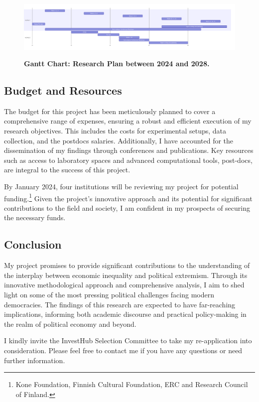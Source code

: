 \documentclass[letterpaper]{article}
\begin{document}
\begin{figure}[h]
\caption{{\bf Gantt Chart: Research Plan between 2024 and 2028.}}
\includegraphics[width=\textwidth]{gantt.png} 
\label{fig:1}
\end{figure}


\subsection*{Budget and Resources}

The budget for this project has been meticulously planned to cover a comprehensive range of expenses, ensuring a robust and efficient execution of my research objectives. This includes the costs for experimental setups, data collection, and the postdocs salaries. Additionally, I have accounted for the dissemination of my findings through conferences and publications. Key resources such as access to laboratory spaces and advanced computational tools, post-docs, are integral to the success of this project. 

\vspace{2mm}By January 2024, four institutions will be reviewing my project for potential funding.\footnote{Kone Foundation, Finnish Cultural Foundation, ERC and Research Council of Finland.} Given the project's innovative approach and its potential for significant contributions to the field and society, I am confident in my prospects of securing the necessary funds. 

\subsection*{Conclusion}

My project promises to provide significant contributions to the understanding of the interplay between economic inequality and political extremism. Through its innovative methodological approach and comprehensive analysis, I aim to shed light on some of the most pressing political challenges facing modern democracies. The findings of this research are expected to have far-reaching implications, informing both academic discourse and practical policy-making in the realm of political economy and beyond.

\vspace{2mm}I kindly invite the InvestHub Selection Committee to take my re-application into consideration. Please feel free to contact me if you have any questions or need further information.



\newpage
\printbibliography
\end{document}
